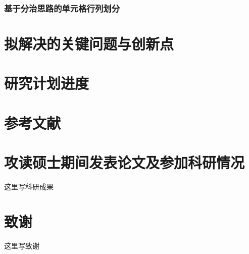 \documentclass[number, UTF8,12pt, AutoFakeBold,fontset = founder]{ctexart}
\begin{document}
\subsubsection{基于分治思路的单元格行列划分}

\section{拟解决的关键问题与创新点}

\section{研究计划进度}

\clearpage
{} %
\section*{参考文献}


\clearpage
{} %
\section*{攻读硕士期间发表论文及参加科研情况}
这里写科研成果

\clearpage
{} %
\section*{致谢}
这里写致谢
\end{document}
